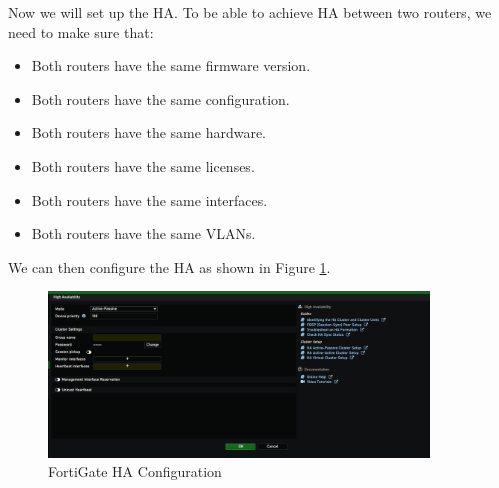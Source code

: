 \documentclass[12pt]{report}
\begin{document}
Now we will set up the HA. To be able to achieve HA between two routers, we need to make sure that:
\begin{itemize}
    \item Both routers have the same firmware version.
    \item Both routers have the same configuration.
    \item Both routers have the same hardware.
    \item Both routers have the same licenses.
    \item Both routers have the same interfaces.
    \item Both routers have the same VLANs.

\end{itemize}
We can then configure the HA as shown in Figure \ref{fig:ha}.
\begin{figure}
    \centering
    \includegraphics[width=0.9\textwidth]{images/Implementation/haconfig.png}
    \caption{FortiGate HA Configuration}
    \label{fig:ha}
\end{figure}
\end{document}
